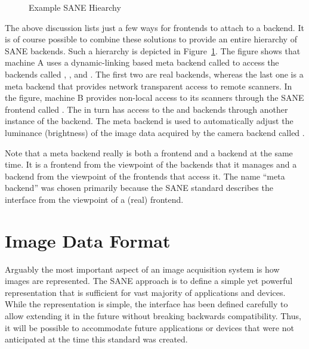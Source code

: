 \documentclass[11pt,DVIps]{report}
\begin{document}
\begin{figure}[htbp]
  \begin{center}
    \leavevmode
    \caption{Example SANE Hiearchy}
    \label{fig:hierarchy}
  \end{center}
\end{figure}

The above discussion lists just a few ways for frontends to attach to
a backend.  It is of course possible to combine these solutions to
provide an entire hierarchy of SANE backends.  Such a hierarchy is
depicted in Figure~\ref{fig:hierarchy}.  The figure shows that machine
A uses a dynamic-linking based meta backend called  to
access the backends called , , and .
The first two are real backends, whereas the last one is a meta
backend that provides network transparent access to remote scanners.
In the figure, machine B provides non-local access to its scanners
through the SANE frontend called .  The  in
turn has access to the  and  backends through
another instance of the  backend.  The  meta
backend is used to automatically adjust the luminance (brightness) of
the image data acquired by the camera backend called .

Note that a meta backend really is both a frontend and a backend at
the same time.  It is a frontend from the viewpoint of the backends
that it manages and a backend from the viewpoint of the frontends that
access it.  The name ``meta backend'' was chosen primarily because the
SANE standard describes the interface from the viewpoint of a (real)
frontend.


\section{Image Data Format}\label{sec:imageformat}

Arguably the most important aspect of an image acquisition system is
how images are represented.  The SANE approach is to define a simple
yet powerful representation that is sufficient for vast majority of
applications and devices.  While the representation is simple, the
interface has been defined carefully to allow extending it in the
future without breaking backwards compatibility.  Thus, it will be
possible to accommodate future applications or devices that were not
anticipated at the time this standard was created.
\end{document}
